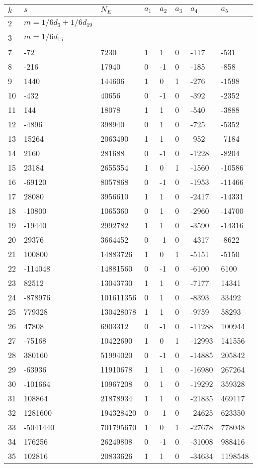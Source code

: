 \documentclass{amsart}
\begin{document}
\begin{longtable}{|l|l|l|lllll|}
\hline
$k$ & $s$ & $N_E$ & $a_1$ & $a_2$ & $a_3$ & $a_4$ & $a_5$\\
\hline
2&$m=1/6d_{3}+1/6d_{19}$&&\multicolumn{5}{c|}{}\\
3&$m=1/6d_{15}$&&\multicolumn{5}{c|}{}\\
7&-72&7230&1&1&0&-117&-531\\
8&-216&17940&0&-1&0&-185&-858\\
9&1440&144606&1&0&1&-276&-1598\\
10&-432&40656&0&-1&0&-392&-2352\\
11&144&18078&1&1&0&-540&-3888\\
12&-4896&398940&0&1&0&-725&-5352\\
13&15264&2063490&1&1&0&-952&-7184\\
14&2160&281688&0&-1&0&-1228&-8204\\
15&23184&2655354&1&0&1&-1560&-10586\\
16&-69120&8057868&0&-1&0&-1953&-11466\\
17&28080&3956610&1&1&0&-2417&-14331\\
18&-10800&1065360&0&1&0&-2960&-14700\\
19&-19440&2992782&1&1&0&-3590&-14316\\
20&29376&3664452&0&-1&0&-4317&-8622\\
21&100800&14883726&1&0&1&-5151&-5150\\
22&-114048&14881560&0&-1&0&-6100&6100\\
23&82512&13043730&1&1&0&-7177&14341\\
24&-878976&101611356&0&1&0&-8393&33492\\
25&779328&130428078&1&1&0&-9759&58293\\
26&47808&6903312&0&-1&0&-11288&100944\\
27&-75168&10422690&1&0&1&-12993&141556\\
28&380160&51994020&0&-1&0&-14885&205842\\
29&-63936&11910678&1&1&0&-16980&267264\\
30&-101664&10967208&0&1&0&-19292&359328\\
31&108864&21878934&1&1&0&-21835&469117\\
32&1281600&194328420&0&-1&0&-24625&623350\\
33&-5041440&701795670&1&0&1&-27678&778048\\
34&176256&26249808&0&-1&0&-31008&988416\\
35&102816&20833626&1&1&0&-34634&1198548\\

\end{longtable}
\end{document}
